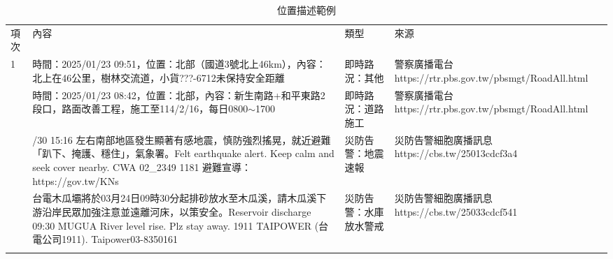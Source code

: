 \begin{table}[htbp]
\centering
\caption{位置描述範例}
\label{tab:dailyLocaTable}
\begin{adjustbox}{max width=\textwidth}
\renewcommand{\arraystretch}{1.4}
\begin{tabular}{>{\centering\arraybackslash}m{1cm} >{\centering\arraybackslash}m{7.5cm} >{\centering\arraybackslash}m{3.5cm} >{\centering\arraybackslash}m{5cm}}
\Xhline{1.2pt}
項次 & 內容 & 類型 & 來源 \\
\Xhline{1.2pt}
1 & 時間：2025/01/23 09:51，位置：北部（國道3號北上46km），內容：北上在46公里，樹林交流道，小貨???-6712未保持安全距離 & 即時路況：其他 & 警察廣播電台 https://rtr.pbs.gov.tw/pbsmgt/RoadAll.html \\
\hline
2 & 時間：2025/01/23 08:42，位置：北部，內容：新生南路+和平東路2段口，路面改善工程，施工至114/2/16，每日0800$\sim$1700 & 即時路況：道路施工 & 警察廣播電台 https://rtr.pbs.gov.tw/pbsmgt/RoadAll.html \\
\hline
3 & [地震速報 Earthquake Alert] 01/30 15:16 左右南部地區發生顯著有感地震，慎防強烈搖晃，就近避難「趴下、掩護、穩住」，氣象署。Felt earthquake alert. Keep calm and seek cover nearby. CWA 02\_2349 1181 避難宣導：https://gov.tw/KNs & 災防告警：地震速報 & 災防告警細胞廣播訊息 https://cbs.tw/25013cdcf3a4 \\
\hline
4 & [水壩放水警戒] 台電木瓜壩將於03月24日09時30分起排砂放水至木瓜溪，請木瓜溪下游沿岸民眾加強注意並遠離河床，以策安全。Reservoir discharge 09:30 MUGUA River level rise. Plz stay away. 1911 TAIPOWER (台電公司1911). Taipower03-8350161 & 災防告警：水庫放水警戒 & 災防告警細胞廣播訊息 https://cbs.tw/25033cdcf541 \\
\Xhline{1.2pt}
\end{tabular}
\end{adjustbox}
\end{table}